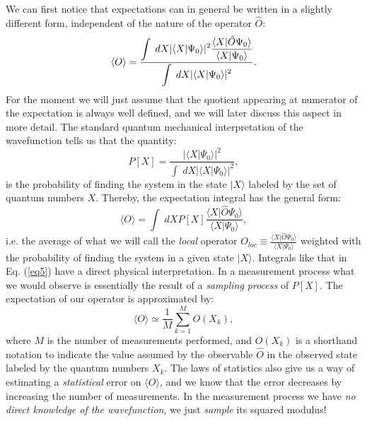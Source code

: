 We can first notice that expectations can in general be written in a slightly different form, independent
of the nature of the operator $\hat{O}$:
\begin{equation}
\langle O\rangle =\displaystyle\frac{\displaystyle\int\; dX \vert \langle X\vert \Psi_0\rangle\vert^2\displaystyle\displaystyle\frac{\langle X \vert \hat{O}\Psi_0\rangle}{\langle X\vert \Psi_0\rangle}}{\displaystyle\int\; dX \vert\langle X \vert \Psi_0\rangle \vert^2}.
\end{equation}
For the moment we will just assume that the quotient appearing at numerator of the expectation is always well defined, and we will later discuss this aspect in more detail.
The standard quantum mechanical interpretation of the wavefunction tells us that the quantity:
\begin{equation}
P[X]=\frac{\vert \langle X\vert \Psi_0\rangle\vert^2}{\displaystyle\int\; dX \vert\langle X \vert \Psi_0\rangle \vert^2},
\end{equation}  
is the probability of finding the system in the state $\vert X \rangle$ labeled by the set of quantum numbers $X$. Thereby, the expectation integral has the general form:
\begin{equation}
\langle O\rangle =\int\; dX P[X]\displaystyle\frac{\langle X \vert \hat{O}\Psi_0\rangle}{\langle X\vert \Psi_0\rangle},
\label{eq5}
\end{equation}
i.e. the average of what we will call the {\it local} operator $O_{loc}\equiv \frac{\langle X \vert \hat{O}\Psi_0\rangle}{\langle X\vert \Psi_0\rangle}$ weighted with the probability of finding the system in a given state $\vert X\rangle$. 
Integrals like that in Eq. (\ref{eq5}) have a direct physical interpretation. In a measurement process what we would observe is essentially the result of a {\it sampling process} of $P[X]$. The expectation of our operator is approximated by:
\begin{equation}
\langle O \rangle \simeq \frac{1}{M}\sum_{k=1}^M{O(X_k)},
\end{equation}
where $M$ is the number of measurements performed, and $O(X_k)$ is a shorthand notation to 
indicate the value assumed by the observable $\hat{O}$ in the observed state labeled by the quantum numbers $X_k$. The laws of statistics also give us a way of estimating a {\it statistical} error on $\langle O \rangle$, and we know that the error decreases by increasing 
the number of measurements. In the measurement process we have {\it no direct knowledge  of the wavefunction}, we just {\it sample} its squared modulus! 

